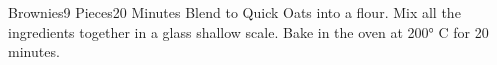 \begin{recipe}{Brownies}{9 Pieces}{20 Minutes}
    Blend to Quick Oats into a flour.
    Mix all the ingredients together in a glass shallow scale.
    Bake in the oven at 200° C for 20 minutes.
\end{recipe}